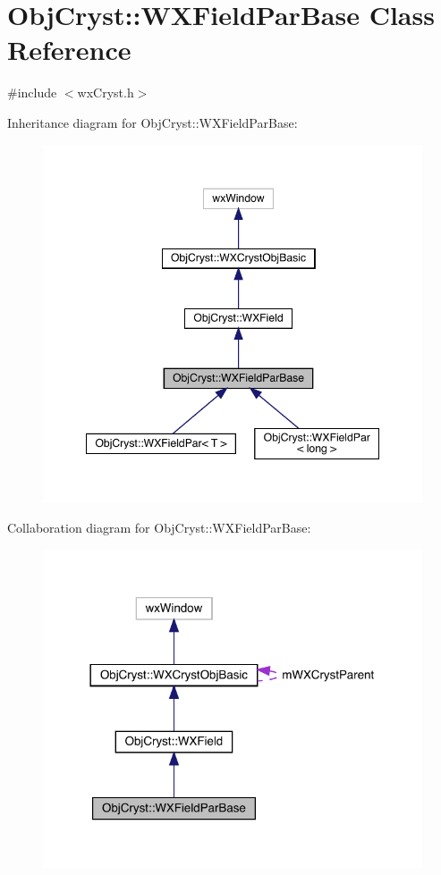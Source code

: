\hypertarget{class_obj_cryst_1_1_w_x_field_par_base}{}\section{Obj\+Cryst\+::W\+X\+Field\+Par\+Base Class Reference}
\label{class_obj_cryst_1_1_w_x_field_par_base}


{\ttfamily \#include $<$wx\+Cryst.\+h$>$}



Inheritance diagram for Obj\+Cryst\+::W\+X\+Field\+Par\+Base\+:
\nopagebreak
\begin{figure}[H]
\begin{center}
\leavevmode
\includegraphics[width=348pt]{class_obj_cryst_1_1_w_x_field_par_base__inherit__graph}
\end{center}
\end{figure}


Collaboration diagram for Obj\+Cryst\+::W\+X\+Field\+Par\+Base\+:
\nopagebreak
\begin{figure}[H]
\begin{center}
\leavevmode
\includegraphics[width=318pt]{class_obj_cryst_1_1_w_x_field_par_base__coll__graph}
\end{center}
\end{figure}
